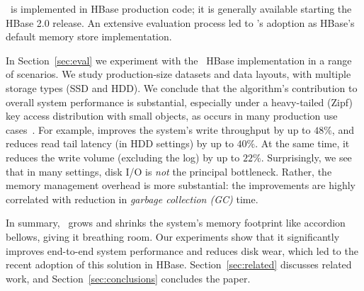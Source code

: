 \sys\ is implemented in HBase production code; it is generally available starting the HBase 2.0 release. 
An extensive evaluation process led to \sys's adoption as HBase's default memory store implementation. 

In Section~\ref{sec:eval} we experiment with the \sys\ HBase implementation in a range of scenarios.
We study production-size datasets and data layouts, with multiple storage types (SSD and HDD). 
We conclude that the algorithm's contribution to overall system performance is substantial, 
especially under a  heavy-tailed (Zipf) key access distribution with 
small objects, as occurs in many production use cases~\cite{Wu2015}. For example, \sys\/ 
improves the system's write throughput by up to $48\%$, and reduces read tail latency 
(in HDD settings)  
by up to $40\%$. At the same time, it reduces the write volume (excluding the log) by up to $22\%$. Surprisingly, we see 
that in many settings, disk I/O is \emph{not} the principal bottleneck. Rather, the memory management 
overhead is more substantial: the improvements are highly correlated with  reduction in \emph{garbage collection (GC)} time. 

In summary, \sys\ grows and shrinks the system's memory footprint like accordion bellows, giving it breathing 
room. Our experiments show that it significantly improves end-to-end system performance and reduces disk wear, 
which led to the recent adoption of this solution in HBase. Section~\ref{sec:related} discusses related work, 
and Section~\ref{sec:conclusions} concludes the paper.

